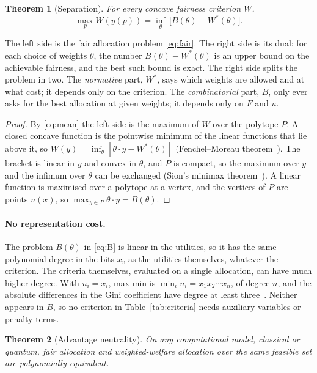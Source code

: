 \documentclass[11pt,a4paper]{article}
\newtheorem{theorem}{Theorem}
\begin{document}
\begin{theorem}[Separation]\label{thm:sep}
For every concave fairness criterion $W$,
\begin{equation}\label{eq:sep}
\max_p W(y(p))=\inf_\theta\,\bigl[B(\theta)-W^*(\theta)\bigr].
\end{equation}
\end{theorem}

The left side is the fair allocation problem \eqref{eq:fair}. The right side is its dual: for each
choice of weights $\theta$, the number $B(\theta)-W^*(\theta)$ is an upper bound on the achievable
fairness, and the best such bound is exact. The right side splits the problem in two. The
\emph{normative} part, $W^*$, says which weights are allowed and at what cost; it depends only on the
criterion. The \emph{combinatorial} part, $B$, only ever asks for the best allocation at given
weights; it depends only on $F$ and $u$.

\begin{proof}
By \eqref{eq:mean} the left side is the maximum of $W$ over the polytope $P$. A closed concave function
is the pointwise minimum of the linear functions that lie above it, so
$W(y)=\inf_\theta[\theta\cdot y-W^*(\theta)]$ (Fenchel--Moreau
theorem~\cite{rockafellar1970convex,fenchel1949conjugate}). The bracket is linear in $y$ and convex in
$\theta$, and $P$ is compact, so the maximum over $y$ and the infimum over $\theta$ can be exchanged
(Sion's minimax theorem~\cite{sion1958general}). A linear function is maximised over a polytope at a
vertex, and the vertices of $P$ are points $u(x)$, so $\max_{y\in P}\theta\cdot y=B(\theta)$.
\end{proof}

\paragraph{No representation cost.} The problem $B(\theta)$ in \eqref{eq:B} is linear in the utilities,
so it has the same polynomial degree in the bits $x_v$ as the utilities themselves, whatever the
criterion. The criteria themselves, evaluated on a single allocation, can have much higher degree.
With $u_i=x_i$, max-min is $\min_iu_i=x_1x_2\cdots x_n$, of degree $n$, and the absolute differences in
the Gini coefficient have degree at least three~\cite{boros2002pseudo}. Neither appears in $B$, so no
criterion in Table~\ref{tab:criteria} needs auxiliary variables or penalty terms.

\begin{theorem}[Advantage neutrality]\label{thm:neutral}
On any computational model, classical or quantum, fair allocation and weighted-welfare allocation
over the same feasible set are polynomially equivalent.
\end{theorem}
\end{document}
